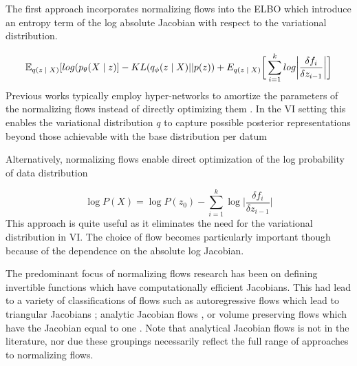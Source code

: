 


The first approach incorporates normalizing flows into the \ac{ELBO} which introduce an entropy term of the log absolute Jacobian with respect to the variational distribution.

\begin{equation}
\operatorname{\mathbb{E}}_{q(z \; | \;{X})} [ log(p_{\theta}(X \; | \;{z}) ]  - KL(q_{\phi}(z \; | \;{X}) || p(z)) + E_{q(z\; | \;{X})}\bigg[\sum_{i=1}^{k}log \bigg|\frac{\delta f_{i}}{\delta z_{i-1}}\bigg|\bigg]
\end{equation}
Previous works typically employ hyper-networks \cite{ha2016hypernets} to amortize the parameters of the normalizing flows instead of directly optimizing them  \cite{rezende2015VIwithNF,tomczak2016Householder,vdberg2018sylvester}. In the \ac{VI} setting this enables the variational distribution $q$ to capture possible posterior representations beyond those achievable with the base distribution per datum

Alternatively, normalizing flows enable direct optimization of the  log probability of  data distribution
 
\begin{equation}
	\log P(X) = \log P(z_{0}) - \sum_{i=1}^{k} \log \bigg| \frac{\delta f_{i}}{\delta z_{i-1}} \bigg|
\end{equation}
This approach is quite useful as it eliminates the need for the variational distribution in \ac{VI}. The choice of flow becomes particularly important though because of the dependence on the absolute log Jacobian. %

The predominant focus of normalizing flows research has been on defining invertible functions which have computationally efficient Jacobians. This had lead to a variety of classifications of flows such as autoregressive flows which lead to triangular Jacobians \cite{kingma2016IAF, papamakarios2017MAF}; analytic Jacobian flows \cite{rezende2015VIwithNF,vdberg2018sylvester}, or volume preserving flows which have the Jacobian equal to one \cite{tomczak2016Householder,tran2019discreteflows,hoogeboom2019IntegerDiscreteFlows}. Note that analytical Jacobian flows is not in the literature, nor due these groupings necessarily reflect the full range of approaches to normalizing flows. 



